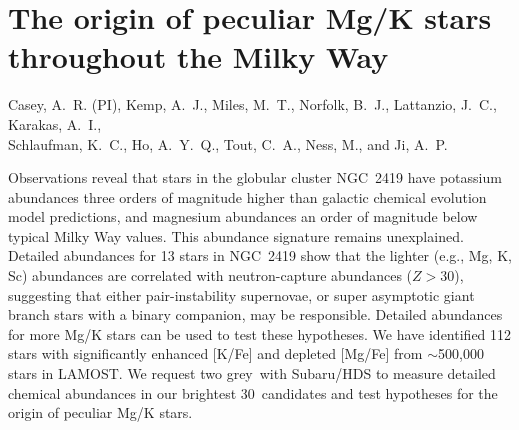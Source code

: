 \documentclass[12pt]{report}
\newcommand{\NumStars}{30}
\newcommand{\NumNights}{two grey}
\begin{document}
\section*{The origin of peculiar Mg/K stars throughout the Milky Way}\vspace{-\parskip}

\begin{center}
Casey, A.~R. (PI), Kemp, A.~J., Miles, M.~T., Norfolk, B.~J., Lattanzio, J.~C., Karakas, A.~I.,\\ Schlaufman, K.~C., Ho, A.~Y.~Q., Tout, C.~A., Ness, M., and Ji, A.~P.
\end{center}

\newcommand{\refnum}[1]{[#1]}

\begin{highlightbox}
Observations reveal that stars in the globular cluster NGC~2419 have potassium abundances three orders of magnitude higher than galactic chemical evolution model predictions, and magnesium abundances an order of magnitude below typical Milky Way values. This abundance signature remains unexplained. Detailed abundances for 13 stars in NGC~2419 show that the lighter (e.g., Mg, K, Sc) abundances are correlated with neutron-capture abundances ($Z > 30$), suggesting that either pair-instability supernovae, or super asymptotic giant branch stars with a binary companion, may be responsible. Detailed abundances for more Mg/K stars can be used to test these hypotheses. We have identified 112 stars with significantly enhanced [K/Fe] and depleted [Mg/Fe] from $\sim$500,000 stars in LAMOST. We request \NumNights\ with Subaru/HDS to measure detailed chemical abundances in our brightest \NumStars\ candidates and test hypotheses for the origin of peculiar Mg/K stars.
\end{highlightbox}\vspace{-\parskip}
\end{document}
